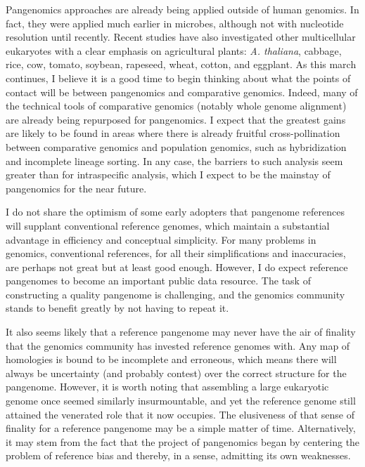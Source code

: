 \documentclass[11pt]{ucthesis}
\begin{document}
Pangenomics approaches are already being applied outside of human genomics. In fact, they were applied much earlier in microbes\cite{medini2005microbial}, although not with nucleotide resolution until recently\cite{colquhoun2020nucleotide}. Recent studies have also investigated other multicellular eukaryotes with a clear emphasis on agricultural plants: \textit{A. thaliana}\cite{alonso20161}, cabbage\cite{golicz2016pangenome}, rice\cite{sun2017rpan,zhou2020platinum,qin2021pan}, cow\cite{crysnanto2019accurate,crysnanto2020bovine,crysnanto2021novel}, tomato\cite{gao2019tomato}, soybean\cite{liu2020pan}, rapeseed\cite{song2020eight}, wheat\cite{walkowiak2020multiple}, cotton\cite{li2021cotton}, and eggplant\cite{barchi2021improved}. As this march continues, I believe it is a good time to begin thinking about what the points of contact will be between pangenomics and comparative genomics. Indeed, many of the technical tools of comparative genomics (notably whole genome alignment) are already being repurposed for pangenomics\cite{armstrong2020progressive}. I expect that the greatest gains are likely to be found in areas where there is already fruitful cross-pollination between comparative genomics and population genomics, such as hybridization and incomplete lineage sorting. In any case, the barriers to such analysis seem greater than for intraspecific analysis, which I expect to be the mainstay of pangenomics for the near future.

I do not share the optimism of some early adopters that pangenome references will supplant conventional reference genomes, which maintain a substantial advantage in efficiency and conceptual simplicity. For many problems in genomics, conventional references, for all their simplifications and inaccuracies, are perhaps not great but at least good enough. However, I do expect reference pangenomes to become an important public data resource. The task of constructing a quality pangenome is challenging, and the genomics community stands to benefit greatly by not having to repeat it. 

It also seems likely that a reference pangenome may never have the air of finality that the genomics community has invested reference genomes with. Any map of homologies is bound to be incomplete and erroneous, which means there will always be uncertainty (and probably contest) over the correct structure for the pangenome. However, it is worth noting that assembling a large eukaryotic genome once seemed similarly insurmountable, and yet the reference genome still attained the venerated role that it now occupies. The elusiveness of that sense of finality for a reference pangenome may be a simple matter of time. Alternatively, it may stem from the fact that the project of pangenomics began by centering the problem of reference bias and thereby, in a sense, admitting its own weaknesses. 
\end{document}
